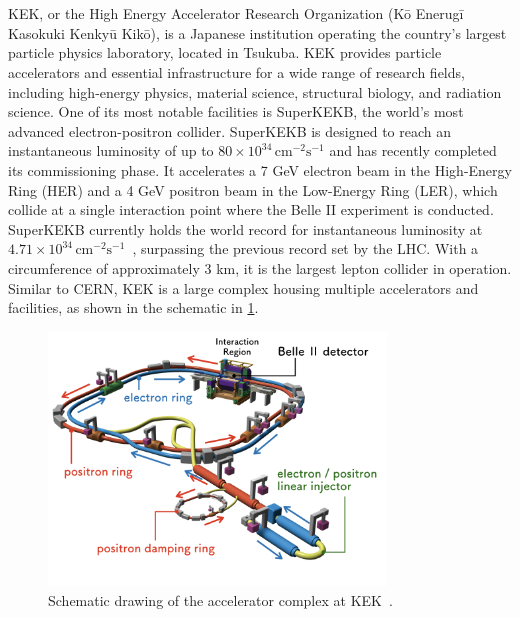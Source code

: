 \section{}

KEK, or the High Energy Accelerator Research Organization (Kō Enerugī Kasokuki Kenkyū Kikō), is a
Japanese institution operating the country's largest particle physics laboratory, located in
Tsukuba. KEK provides particle accelerators and essential infrastructure for a wide range of
research fields, including high-energy physics, material science, structural biology, and radiation
science. One of its most notable facilities is SuperKEKB, the world's most advanced
electron-positron collider. SuperKEKB is designed to reach an instantaneous luminosity of up to $80
\times 10^{34} \, \text{cm}^{-2}\text{s}^{-1}$ and has recently completed its commissioning phase.
It accelerates a 7 GeV electron beam in the High-Energy Ring (HER) and a 4 GeV positron beam in the
Low-Energy Ring (LER), which collide at a single interaction point where the Belle II experiment is
conducted. SuperKEKB currently holds the world record for instantaneous luminosity at $4.71 \times
10^{34} \, \text{cm}^{-2}\text{s}^{-1}$~\cite{zhou_luminosity_2023}, surpassing the previous record
set by the LHC.  With a circumference of approximately 3 km, it is the largest lepton collider in
operation.  Similar to CERN, KEK is a large complex housing multiple accelerators and facilities, as
shown in the schematic in \cref{fig:kek:layout_superkekb}.

\begin{figure}[!htb]
    \includegraphics[width=0.8\textwidth]{./images/kek/layout_kekb.jpg}
    \caption{Schematic drawing of the accelerator complex at KEK~\cite{noauthor_operation_2024}.}
    \label{fig:kek:layout_superkekb}
\end{figure}

